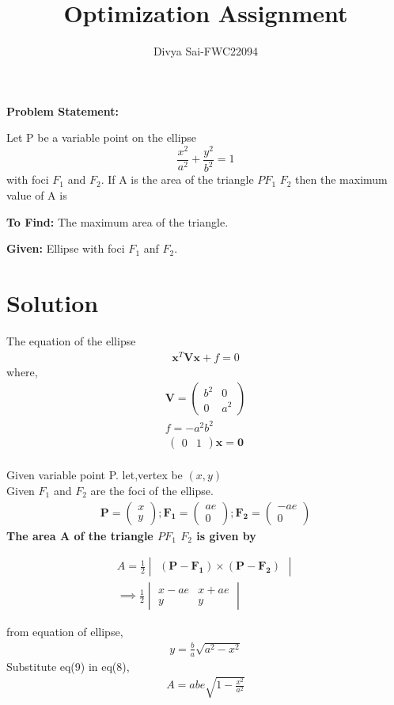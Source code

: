 \documentclass[10pt,twocolumn]{article}
\title{\textbf{Optimization Assignment}}
\author{Divya Sai-FWC22094}
\let\vec\mathbf
\newcommand{\myvec}[1]{\ensuremath{\begin{pmatrix}#1\end{pmatrix}}}
\newcommand{\mydet}[1]{\ensuremath{\begin{vmatrix}#1\end{vmatrix}}}
\providecommand{\brak}[1]{\ensuremath{\left(#1\right)}}
\begin{document}
\maketitle

\textbf{\large{Problem Statement: }} \\
\raggedright Let P be a variable point on the ellipse $$\frac{x^2}{a^2}+ \frac{y^2}{b^2} = 1 $$ with foci $F_1$ and $F_2$. If A is the area of the triangle $PF_1$ $F_2$ then the maximum value of A is

\textbf{To Find:} The maximum area of the triangle.

\textbf{Given:} Ellipse with foci $F_1$ anf $F_2$.\\
\section{Solution}
The equation of the ellipse
\begin{align}
	\vec{x}^T\vec{V}\vec{x} + f = 0 
	\label{eq:ellipse}	
\end{align}
where,
\begin{align}
	\vec{V} = \myvec{b^2&0\\0&a^2}
	\\f = -a^2b^2
\end{align}
	\begin{align}
		\myvec{0&1}\vec{x} = \vec{0}
	\end{align}
\\Given variable point P. let,vertex be $(x,y)$
\\Given $F_1$ and $F_2$ are the foci of the ellipse.
\begin{align}
	\vec{P} = \myvec{x \\ y} ;
	\vec{F_1} = \myvec{ae \\ 0} ;
	\vec{F_2} = \myvec{-ae \\ 0} 
\end{align}
\textbf{The area A of the triangle $PF_1$ $F_2$ is given by }
	
\begin{align}
A = \frac{1}{2} \mydet{\vec{\brak{P-F_1}} \times \vec{\brak{P-F_2}}}
	\\ \implies \frac{1}{2} \mydet{x-ae & x+ae \\ y & y}	
\end{align}
\begin{center}	
\end{center}
from equation of ellipse,
\begin{align}
	 y = \frac{b}{a}\sqrt{a^2-x^2}
\end{align} 
\vspace{5mm}
Substitute eq(9) in eq(8),
\vspace{5mm}
\begin{align}
 A=abe \sqrt{1-\frac{x^2}{a^2}}
\end{align}
\end{document}
